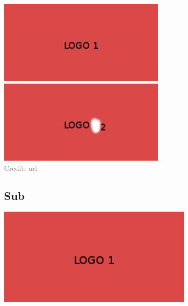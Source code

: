 \begin{frame}
  \begin{center}
    \includegraphics[width=0.6\textwidth]{logo1.jpg}\\
    \bigskip
    \pause%
    \includegraphics[width=0.6\textwidth]{logo2.jpg}\\
    \smallskip
    \textcolor{gray}{\tiny Credit: url}
  \end{center}
\end{frame}

\subsection{Sub}
\begin{frame}
  \pause[7]
  \centering \includegraphics[width=0.7\textwidth]{logo1.jpg}
\end{frame}

